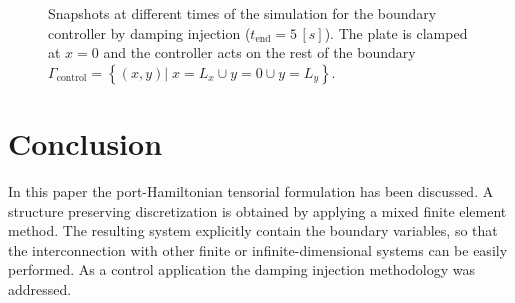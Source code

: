 \documentclass[letterpaper, 10 pt, conference]{ieeeconf}
\begin{document}
\begin{figure*}[t]
	\centering
		\hfil
		\hfil
	\caption{Snapshots at different times of the simulation for the boundary controller by damping injection ($t_{\text{end}} = 5 \,[s]$). The plate is clamped at $x = 0$ and the controller acts on the rest of the boundary $\Gamma_{\text{control}} = \left\{(x,y) \vert\; x=L_x \cup y=0 \cup y = L_y \right\}$.}
	\label{fig:SnapDamp}
	\hfil
\end{figure*}


\section{Conclusion}
In this paper the port-Hamiltonian tensorial formulation has been discussed. A structure preserving discretization is obtained by applying a mixed finite element method. The resulting system explicitly contain the boundary variables, so that the interconnection with other finite or infinite-dimensional systems can be easily performed. As a control application the damping injection methodology was addressed.



\addtolength{\textheight}{-3.2cm}   %
\end{document}

